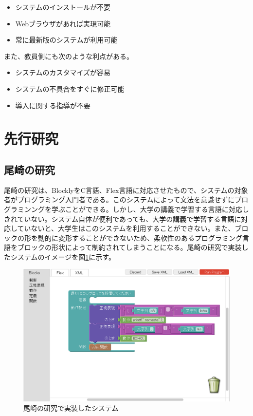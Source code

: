 \documentclass{eniepaper}
\begin{document}
\begin{itemize}
\item システムのインストールが不要
\item Webブラウザがあれば実現可能
\item 常に最新版のシステムが利用可能
\end{itemize} 

また、教員側にも次のような利点がある。

\begin{itemize}
\item システムのカスタマイズが容易
\item システムの不具合をすぐに修正可能
\item 導入に関する指導が不要
\end{itemize} 
 
    \section{先行研究}
    
    \subsection{尾崎の研究}
 
 尾崎の研究\cite{ozaki}は、BlocklyをC言語、Flex言語に対応させたもので、システムの対象者がプログラミング入門者である。このシステムによって文法を意識せずにプログラミンングを学ぶことができる。しかし、大学の講義で学習する言語に対応しきれていない。システム自体が便利であっても、大学の講義で学習する言語に対応していないと、大学生はこのシステムを利用することができない。また、ブロックの形を動的に変形することができないため、柔軟性のあるプログラミング言語をブロックの形状によって制約されてしまうことになる。尾崎の研究で実装したシステムのイメージを図\ref{fig:ozaki}に示す。 


\begin{figure}[h]
\begin{center}
\includegraphics[scale=0.5]{img/ozaki.eps}
\caption{尾崎の研究で実装したシステム}%
\label{fig:ozaki}
\end{center}%
\end{figure}%
 
\end{document}
